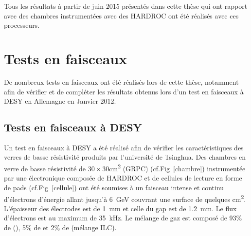 \vspace*{-0.8cm}
 Tous les résultats à partir de juin 2015 présentés dans cette thèse qui ont rapport avec des chambres instrumentées avec des HARDROC ont été réalisés avec ces processeurs.
\vspace*{-0.3cm}
\section{Tests en faisceaux}
\vspace*{-0.3cm}
De nombreux tests en faisceaux ont été réalisés lors de cette thèse, notamment afin de vérifier et de compléter les résultats obtenus lors d'un test en faisceaux à DESY en Allemagne en Janvier 2012.
\vspace*{-0.25cm}
\subsection{Tests en faisceaux à DESY}
\vspace*{-0.25cm}
Un test en faisceaux à DESY \cite{Haddad:2012fx} a été réalisé afin de vérifier les caractéristiques des verres de basse résistivité produits par l'université de Tsinghua. Des chambres en verre de basse résistivité de $30\times30$\si{\square\centi\meter} (GRPC) (cf.Fig~\ref{chambre}) instrumentée par une électronique composée de HARDROC et de cellules de lecture en forme de pads (cf.Fig~\ref{cellule}) ont été soumises à un faisceau intense et continu d'électrons d'énergie allant jusqu'à \SI{6}{\giga\eV} couvrant une surface de quelques \si{\square\centi\meter}. L'épaisseur des électrodes est de \SI{1}{\milli\meter} et celle du gap est de \SI{1.2}{\milli\meter}. Le flux d'électrons est au maximum de \SI{35}{\kilo\hertz}. Le mélange de gaz est composé de 93\% de (), 5\% de  et 2\% de  (mélange ILC).

